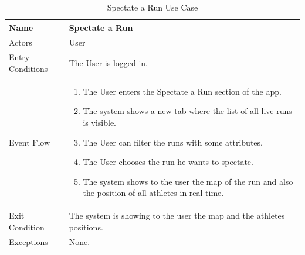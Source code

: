 \begin{enumerate}
\FloatBarrier
\begin{table}[h]
\begin{tabular}{|p{3.4cm}|p{}|}
\hline
Name             & Spectate a Run \\ \hline
Actors           & User  \\ \hline
Entry Conditions & The User is logged in.    \\ \hline
Event Flow       & \begin{enumerate}
            \item The User enters the Spectate a Run section of the app.
            \item The system shows a new tab where the list of all live runs is visible.
            \item The User can filter the runs with some attributes.
            \item The User chooses the run he wants to spectate.
            \item The system shows to the user the map of the run and also the position of all athletes in real time.
        \end{enumerate}\\ \hline
Exit Condition   & The system is showing to the user the map and the athletes positions.\\ \hline
Exceptions       & None.\\ \hline
\end{tabular}
\caption{Spectate a Run Use Case}
\end{table}
\clearpage
\FloatBarrier

\end{enumerate}



